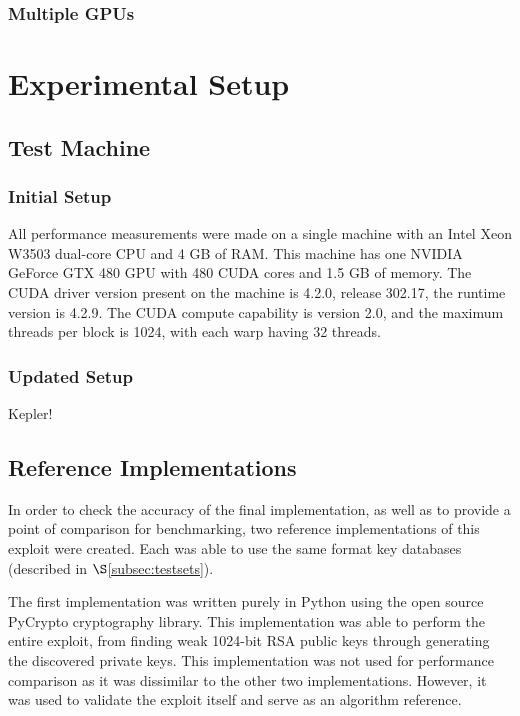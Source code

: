 \documentclass[12pt]{ucthesis}
\begin{document}
\subsection{Multiple GPUs}
\label{subsec:multiGPU}


\chapter{Experimental Setup}
\label{sec:expsetup}

\section{Test Machine}
\label{subsec:testmachine}

\subsection{Initial Setup}
\label{subsubsec:initsetup}
All performance measurements were made on a single machine with an Intel Xeon 
W3503 dual-core CPU and 4 GB of RAM. This machine has one NVIDIA GeForce
GTX 480 GPU with 480 CUDA cores and 1.5 GB of memory. The CUDA driver 
version present on the machine is 4.2.0, release 302.17, the runtime version is
4.2.9. The CUDA compute capability is version 2.0, and the maximum threads per 
block is 1024, with each warp having 32 threads.

\subsection{Updated Setup}
\label{subsubsec:updatedsetup}
Kepler!

\section{Reference Implementations}
\label{subsec:refimpl}
In order to check the accuracy of the final implementation, as well as to 
provide a point of comparison for benchmarking, two reference implementations 
of this exploit were created. Each was able to use the same format key 
databases (described in $\S$\ref{subsec:testsets}). 

The first implementation was written purely in Python using the open source
PyCrypto cryptography library. This implementation was able to perform the
entire exploit, from finding weak 1024-bit RSA public keys through generating
the discovered private keys. This implementation was not used for performance
comparison as it was dissimilar to the other two implementations. However, it
was used to validate the exploit itself and serve as an algorithm reference.
\end{document}
